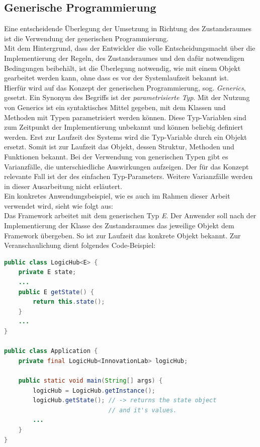 \subsection{Generische Programmierung} %
\label{subsec:java_generics}
Eine entscheidende Überlegung der Umsetzung in Richtung des Zustandsraumes ist die Verwendung der generischen Programmierung. 
\\
Mit dem Hintergrund, dass der Entwickler die volle Entscheidungsmacht über die Implementierung der 
Regeln, des Zustandsraumes und den dafür notwendigen Bedingungen beibehält, ist die Überlegung  
notwendig, wie mit einem Objekt gearbeitet werden kann, ohne dass es vor der Systemlaufzeit bekannt ist. 
\\
\linebreak
Hierfür wird auf das Konzept der generischen Programmierung, sog. \textit{Generics}, gesetzt. Ein Synonym 
des Begriffs ist der \textit{parametrisierte Typ}. Mit der Nutzung von Generics ist ein syntaktisches Mittel 
gegeben, mit dem Klassen und Methoden mit Typen parametrisiert werden können. Diese Typ-Variablen sind zum 
Zeitpunkt der Implementierung unbekannt und können beliebig definiert werden. Erst zur Laufzeit des Systems 
wird die Typ-Variable durch ein Objekt ersetzt. Somit ist zur Laufzeit das 
Objekt, dessen Struktur, Methoden und Funktionen bekannt. Bei der Verwendung von generischen Typen gibt es 
Varianzfälle, die unterschiedliche Auswirkungen aufzeigen. Der für das Konzept relevante Fall ist der des 
einfachen Typ-Parameters. Weitere Varianzfälle werden in dieser Ausarbeitung nicht erläutert. 
\\
\linebreak
Ein konkretes Anwendungsbeispiel, wie es 
auch im Rahmen dieser Arbeit verwendet wird, sieht wie folgt aus:
\\
Das Framework arbeitet mit dem generischen Typ \textit{E}. Der Anwender soll nach der Implementierung der Klasse des Zustandsraumes das 
jeweilige Objekt dem Framework übergeben. So ist zur Laufzeit das konkrete Objekt bekannt. Zur Veranschaulichung dient folgendes Code-Beispiel:
\begin{lstlisting}[language=Java, frame=lines, xleftmargin=\parindent, style=algoBericht, label={code:generics}, captionpos=b, caption={Zustandsobjekt als Typ-Variable}]
public class LogicHub<E> {
    private E state;
    ...
    public E getState() {
        return this.state();
    }
    ...
}

public class Application {
    private final LogicHub<InnovationLab> logicHub;

    public static void main(String[] args) {
        logicHub = LogicHub.getInstance();
        logicHub.getState(); // -> returns the state object 
                             // and it's values.
        ...
    }
}
\end{lstlisting}
